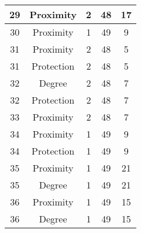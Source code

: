 \documentclass[results.tex]{subfiles}
\begin{document}
\begin{center}
\begin{tabular}{| c || c | c | c | c |}
            \hline
            29                      & Proximity                    & 2                      & 48                      & 17                   \\
            \hline
            30                      & Proximity                    & 1                      & 49                      & 9                    \\
            \hline
            31                      & Proximity                    & 2                      & 48                      & 5                    \\
            \hline
            31                      & Protection                   & 2                      & 48                      & 5                    \\
            \hline
            32                      & Degree                       & 2                      & 48                      & 7                    \\
            \hline
            32                      & Protection                   & 2                      & 48                      & 7                    \\
            \hline
            33                      & Proximity                    & 2                      & 48                      & 7                    \\
            \hline
            34                      & Proximity                    & 1                      & 49                      & 9                    \\
            \hline
            34                      & Protection                   & 1                      & 49                      & 9                    \\
            \hline
            35                      & Proximity                    & 1                      & 49                      & 21                   \\
            \hline
            35                      & Degree                       & 1                      & 49                      & 21                   \\
            \hline
            36                      & Proximity                    & 1                      & 49                      & 15                   \\
            \hline
            36                      & Degree                       & 1                      & 49                      & 15                   \\

\end{tabular}
\end{center}
\end{document}
